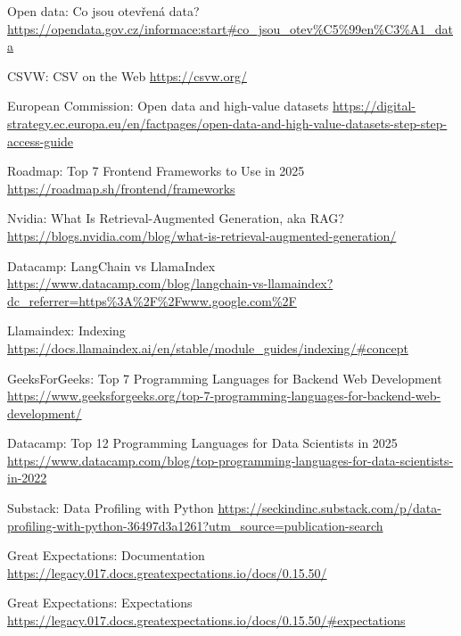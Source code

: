 \begin{thebibliography}{99}


Open data: Co jsou otevřená data?
\url{https://opendata.gov.cz/informace:start#co_jsou_otev\%C5\%99en\%C3\%A1_data}

 CSVW: CSV on the Web \url{https://csvw.org/}

European Commission: Open data and high-value datasets
\url{https://digital-strategy.ec.europa.eu/en/factpages/open-data-and-high-value-datasets-step-step-access-guide}

Roadmap: Top 7 Frontend Frameworks to Use in 2025
\url{https://roadmap.sh/frontend/frameworks}

Nvidia: What Is Retrieval-Augmented Generation, aka RAG?
\url{https://blogs.nvidia.com/blog/what-is-retrieval-augmented-generation/}

Datacamp: LangChain vs LlamaIndex
\url{https://www.datacamp.com/blog/langchain-vs-llamaindex?dc_referrer=https\%3A\%2F\%2Fwww.google.com\%2F}

Llamaindex: Indexing
\url{https://docs.llamaindex.ai/en/stable/module_guides/indexing/\#concept}

GeeksForGeeks: Top 7 Programming Languages for Backend Web Development
\url{https://www.geeksforgeeks.org/top-7-programming-languages-for-backend-web-development/}

Datacamp: Top 12 Programming Languages for Data Scientists in 2025
\url{https://www.datacamp.com/blog/top-programming-languages-for-data-scientists-in-2022}

Substack: Data Profiling with Python
\url{https://seckindinc.substack.com/p/data-profiling-with-python-36497d3a1261?utm_source=publication-search}

Great Expectations: Documentation
\url{https://legacy.017.docs.greatexpectations.io/docs/0.15.50/}

Great Expectations: Expectations
\url{https://legacy.017.docs.greatexpectations.io/docs/0.15.50/#expectations}


\end{thebibliography}
